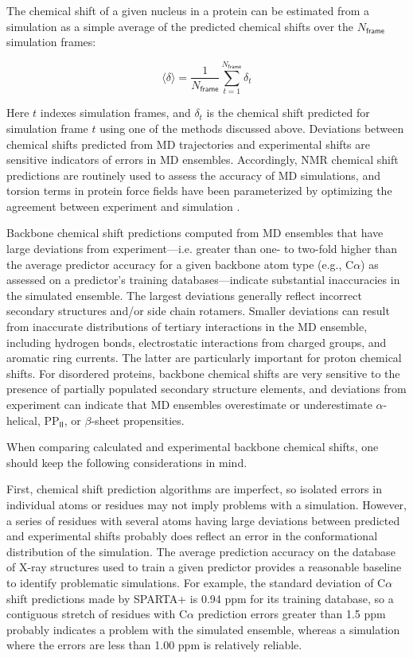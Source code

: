 \documentclass[9pt,review,pubversion]{livecoms}
\begin{document}
The chemical shift of a given nucleus in a protein can be estimated from a simulation as a simple average of the predicted chemical shifts over the $N_{\mathsf{frame}}$ simulation frames: 

\begin{equation}
\label{eqn:shift_estimate}
\langle \delta \rangle = \frac {1} {N_\mathsf{frame}} \sum_{t=1}^{N_{\mathsf{frame}}} \delta_t
\end{equation}

\noindent Here $t$ indexes simulation frames, and $\delta_t$ is the chemical shift predicted for simulation frame $t$ using one of the methods discussed above.
Deviations between chemical shifts predicted from MD trajectories and experimental shifts are sensitive indicators of errors in MD ensembles.
Accordingly, NMR chemical shift predictions are routinely used to assess the accuracy of MD simulations, and torsion terms in protein force fields have been parameterized by optimizing the agreement between experiment and simulation \cite{li_nmr-based_2010,robustelli_developing_2018}.

Backbone chemical shift predictions computed from MD ensembles that have large deviations from experiment---i.e. greater than one- to two-fold higher than the average predictor accuracy for a given backbone atom type (e.g., C$\alpha$) as assessed on a predictor’s training databases---indicate substantial inaccuracies in the simulated ensemble.
The largest deviations generally reflect incorrect secondary structures and/or side chain rotamers.
Smaller deviations can result from inaccurate distributions of tertiary interactions in the MD ensemble, including hydrogen bonds, electrostatic interactions from charged groups, and aromatic ring currents.
The latter are particularly important for proton chemical shifts.
For disordered proteins, backbone chemical shifts are very sensitive to the presence of partially populated secondary structure elements, and deviations from experiment can indicate that MD ensembles overestimate or underestimate $\alpha$-helical, PP$_\mathsf{II}$, or $\beta$-sheet propensities.

When comparing calculated and experimental backbone chemical shifts, one should keep the following considerations in mind.

First, chemical shift prediction algorithms are imperfect, so isolated errors in individual atoms or residues may not imply problems with a simulation.
However, a series of residues with several atoms having large deviations between predicted and experimental shifts probably does reflect an error in the conformational distribution of the simulation.
The average prediction accuracy on the database of X-ray structures used to train a given predictor provides a reasonable baseline to identify problematic simulations.
For example, the standard deviation of C$\alpha$ shift predictions made by SPARTA+ is 0.94 ppm for its training database, so a contiguous stretch of residues with C$\alpha$ prediction errors greater than 1.5 ppm probably indicates a problem with the simulated ensemble, whereas a simulation where the errors are less than 1.00 ppm is relatively reliable.
\end{document}
